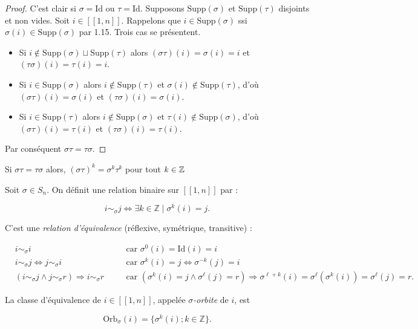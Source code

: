\begin{proof}
C'est clair si $\sigma = \text{Id}$ ou $\tau = \text{Id}$. Supposons $\text{Supp}(\sigma)$ et $\text{Supp}(\tau)$ disjoints et non vides.  
Soit $i \in [[1, n]]$. Rappelons que $i \in \text{Supp}(\sigma)$ ssi $\sigma(i) \in \text{Supp}(\sigma)$ par 1.15. Trois cas se présentent.

\begin{itemize}
    \item Si $i \notin \text{Supp}(\sigma) \sqcup \text{Supp}(\tau)$ alors $(\sigma \tau)(i) = \sigma(i) = i$ et $(\tau \sigma)(i) = \tau(i) = i$.
    \item Si $i \in \text{Supp}(\sigma)$ alors $i \notin \text{Supp}(\tau)$ et $\sigma(i) \notin \text{Supp}(\tau)$, d'où $(\sigma \tau)(i) = \sigma(i)$ et $(\tau \sigma)(i) = \sigma(i)$.
    \item Si $i \in \text{Supp}(\tau)$ alors $i \notin \text{Supp}(\sigma)$ et $\tau(i) \notin \text{Supp}(\sigma)$, d'où $(\sigma \tau)(i) = \tau(i)$ et $(\tau \sigma)(i) = \tau(i)$.
\end{itemize}

Par conséquent $\sigma \tau = \tau \sigma$.
\end{proof}
\begin{remarque}
    Si $\sigma\tau=\tau\sigma$ alors, $(\sigma\tau)^k=\sigma^k\tau^k$ pour tout $k\in \mathbb{Z}$
\end{remarque}
Soit $\sigma \in S_n$. On définit une relation binaire sur $[[1, n]]$ par :

\[
i \sim_{\sigma} j \iff \exists k \in \mathbb{Z} \mid \sigma^k(i) = j.
\]

C'est une \textit{relation d'équivalence} (réflexive, symétrique, transitive) :

\[
\begin{aligned}
    &i \sim_{\sigma} i \quad &&\text{car } \sigma^0(i) = \text{Id}(i) = i \\ 
    &i \sim_{\sigma} j \iff j \sim_{\sigma} i \quad &&\text{car } \sigma^k(i) = j \iff \sigma^{-k}(j) = i \\ 
    &(i \sim_{\sigma} j \wedge j \sim_{\sigma} r) \Rightarrow i \sim_{\sigma} r \quad &&\text{car } (\sigma^k(i) = j \wedge \sigma^\ell(j) = r) \Rightarrow \sigma^{\ell+k}(i) = \sigma^\ell(\sigma^k(i)) = \sigma^\ell(j) = r.
\end{aligned}
\]

La classe d’équivalence de $i \in  [[1, n]]$, appelée \textit{$\sigma$-orbite} de $i$, est

\[
\text{Orb}_{\sigma}(i) = \{\sigma^k(i) ; k \in \mathbb{Z} \}.
\]

